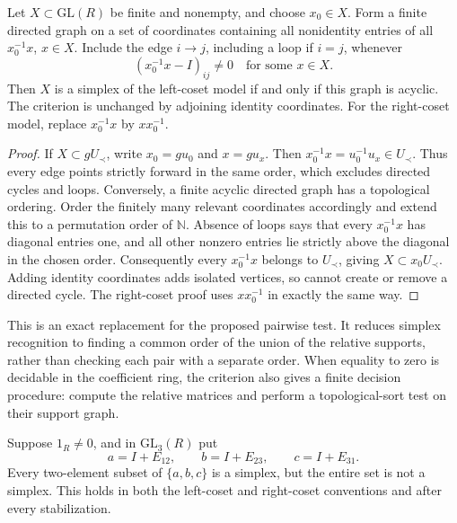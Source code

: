 \begin{proposition}\ours
\label{prop:gy1972-support-criterion}
Let \(X\subset\mathrm{GL}(R)\) be finite and nonempty, and choose
\(x_0\in X\). Form a finite directed graph on a set of coordinates
containing all nonidentity entries of all \(x_0^{-1}x\), \(x\in X\).
Include the edge \(i\to j\), including a loop if \(i=j\), whenever
\[
                (x_0^{-1}x-I)_{ij}\ne0
                \quad\text{for some }x\in X.
\]
Then \(X\) is a simplex of the left-coset model if and only if this graph
is acyclic. The criterion is unchanged by adjoining identity coordinates.
For the right-coset model, replace \(x_0^{-1}x\) by \(xx_0^{-1}\).
\end{proposition}

\begin{proof}
If \(X\subset gU_\prec\), write \(x_0=gu_0\) and \(x=gu_x\).
Then \(x_0^{-1}x=u_0^{-1}u_x\in U_\prec\). Thus every edge points
strictly forward in the same order, which excludes directed cycles and
loops. Conversely, a finite acyclic directed graph has a topological
ordering. Order the finitely many relevant coordinates accordingly and
extend this to a permutation order of \(\mathbb N\). Absence of loops
says that every \(x_0^{-1}x\) has diagonal entries one, and all other
nonzero entries lie strictly above the diagonal in the chosen order.
Consequently every \(x_0^{-1}x\) belongs to \(U_\prec\), giving
\(X\subset x_0U_\prec\). Adding identity coordinates adds isolated
vertices, so cannot create or remove a directed cycle. The right-coset
proof uses \(xx_0^{-1}\) in exactly the same way.
\end{proof}

This is an exact replacement for the proposed pairwise test. It reduces
simplex recognition to finding a common order of the union of the
relative supports, rather than checking each pair with a separate order.
When equality to zero is decidable in the coefficient ring, the criterion
also gives a finite decision procedure: compute the relative matrices
and perform a topological-sort test on their support graph.

\begin{proposition}\ours
\label{prop:gy1972-nonflag-triple}
Suppose \(1_R\ne0\), and in \(\mathrm{GL}_3(R)\) put
\[
 a=I+E_{12},\qquad b=I+E_{23},\qquad c=I+E_{31}.
\]
Every two-element subset of \(\{a,b,c\}\) is a simplex, but the entire
set is not a simplex. This holds in both the left-coset and right-coset
conventions and after every stabilization.
\end{proposition}

